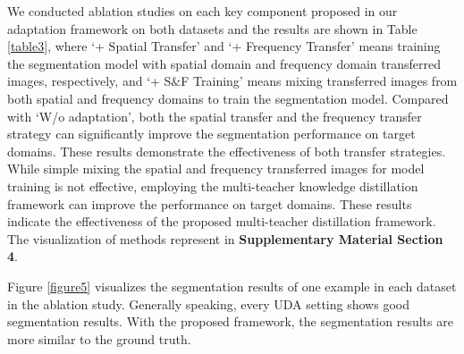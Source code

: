 \documentclass[letterpaper]{article} %
\begin{document}
We conducted ablation studies on each key component proposed in our adaptation framework on both datasets and the results 
are shown in Table \ref{table3}, where `+ Spatial Transfer' and `+ Frequency Transfer' 
means training the segmentation model with spatial domain and frequency domain transferred images, respectively, 
and `+ S$\&$F Training' means mixing transferred images from both spatial and frequency domains to train the segmentation model. 
Compared with `W/o adaptation', both the spatial transfer and the frequency transfer 
strategy can significantly improve the segmentation performance on target domains. These results demonstrate the 
effectiveness of both transfer strategies. While simple mixing the spatial and frequency transferred images 
for model training is not effective, employing the multi-teacher knowledge distillation framework 
can improve the performance on target domains. These results indicate the effectiveness of the 
proposed multi-teacher distillation framework. The visualization of methods represent in \textbf{Supplementary Material Section 4}.


\begin{table}[!t]
    \small
    \centering
    \caption{The ablation studies on the effectiveness of key components. }
    \label{table3}%
  \end{table}%
Figure \ref{figure5} visualizes the segmentation results of one example in each dataset in the ablation study. 
Generally speaking, every UDA setting shows good segmentation results. With 
the proposed framework, the segmentation results are more similar to the ground truth. 
  
\end{document}
